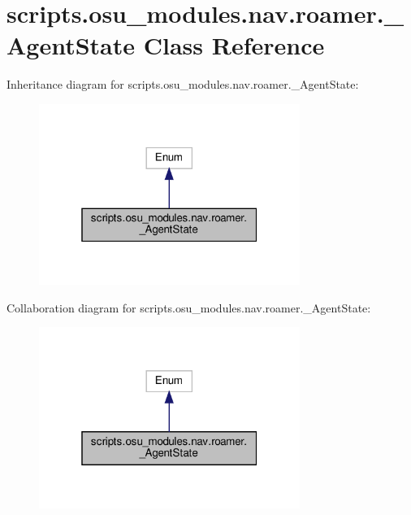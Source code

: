 \hypertarget{classscripts_1_1osu__modules_1_1nav_1_1roamer_1_1__AgentState}{}\section{scripts.\+osu\+\_\+modules.\+nav.\+roamer.\+\_\+\+Agent\+State Class Reference}
\label{classscripts_1_1osu__modules_1_1nav_1_1roamer_1_1__AgentState}


Inheritance diagram for scripts.\+osu\+\_\+modules.\+nav.\+roamer.\+\_\+\+Agent\+State\+:\nopagebreak
\begin{figure}[H]
\begin{center}
\leavevmode
\includegraphics[width=241pt]{dc/dc3/classscripts_1_1osu__modules_1_1nav_1_1roamer_1_1__AgentState__inherit__graph}
\end{center}
\end{figure}


Collaboration diagram for scripts.\+osu\+\_\+modules.\+nav.\+roamer.\+\_\+\+Agent\+State\+:\nopagebreak
\begin{figure}[H]
\begin{center}
\leavevmode
\includegraphics[width=241pt]{d6/d0f/classscripts_1_1osu__modules_1_1nav_1_1roamer_1_1__AgentState__coll__graph}
\end{center}
\end{figure}
